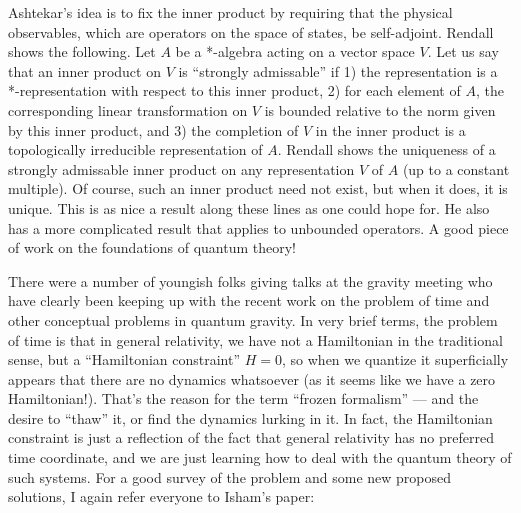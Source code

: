 \documentclass{article}
\def\tightlist{}
\renewcommand{\texttt}[1]{%
  \begingroup
  \ttfamily
  \begingroup\lccode`~=`/\lowercase{\endgroup\def~}{/\discretionary{}{}{}}%
  \begingroup\lccode`~=`[\lowercase{\endgroup\def~}{[\discretionary{}{}{}}%
  \begingroup\lccode`~=`.\lowercase{\endgroup\def~}{.\discretionary{}{}{}}%
  \catcode`/=\active\catcode`[=\active\catcode`.=\active
  \scantokens{#1\noexpand}%
  \endgroup
}
\begin{document}
Ashtekar's idea is to fix the inner product by requiring that the
physical observables, which are operators on the space of states, be
self-adjoint. Rendall shows the following. Let \(A\) be a *-algebra
acting on a vector space \(V\). Let us say that an inner product on
\(V\) is ``strongly admissable'' if 1) the representation is a
*-representation with respect to this inner product, 2) for each element
of \(A\), the corresponding linear transformation on \(V\) is bounded
relative to the norm given by this inner product, and 3) the completion
of \(V\) in the inner product is a topologically irreducible
representation of \(A\). Rendall shows the uniqueness of a strongly
admissable inner product on any representation \(V\) of \(A\) (up to a
constant multiple). Of course, such an inner product need not exist, but
when it does, it is unique. This is as nice a result along these lines
as one could hope for. He also has a more complicated result that
applies to unbounded operators. A good piece of work on the foundations
of quantum theory!


There were a number of youngish folks giving talks at the gravity
meeting who have clearly been keeping up with the recent work on the
problem of time and other conceptual problems in quantum gravity. In
very brief terms, the problem of time is that in general relativity, we
have not a Hamiltonian in the traditional sense, but a ``Hamiltonian
constraint'' \(H = 0\), so when we quantize it superficially appears
that there are no dynamics whatsoever (as it seems like we have a zero
Hamiltonian!). That's the reason for the term ``frozen formalism'' ---
and the desire to ``thaw'' it, or find the dynamics lurking in it. In
fact, the Hamiltonian constraint is just a reflection of the fact that
general relativity has no preferred time coordinate, and we are just
learning how to deal with the quantum theory of such systems. For a good
survey of the problem and some new proposed solutions, I again refer
everyone to Isham's paper:

\end{document}

